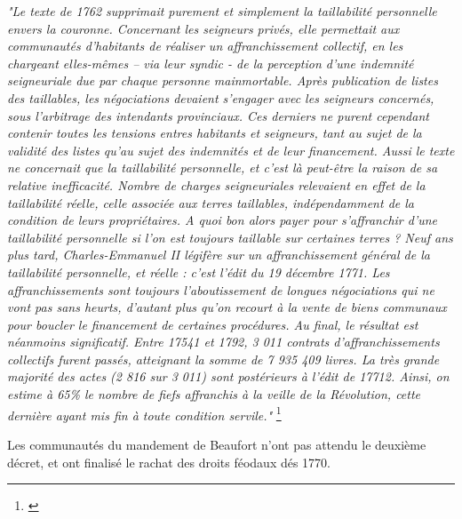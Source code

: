 \documentclass[a4paper,twoside,openany]{article}
\begin{document}
\textit{"Le texte de 1762 supprimait purement et simplement la taillabilité personnelle envers la
couronne. Concernant les seigneurs privés, elle permettait aux communautés d’habitants de
réaliser un affranchissement collectif, en les chargeant elles-mêmes – via leur syndic - de la
perception d’une indemnité seigneuriale due par chaque personne mainmortable. Après
publication de listes des taillables, les négociations devaient s’engager avec les seigneurs
concernés, sous l’arbitrage des intendants provinciaux. Ces derniers ne purent cependant
contenir toutes les tensions entres habitants et seigneurs, tant au sujet de la validité des listes
qu’au sujet des indemnités et de leur financement. Aussi le texte ne concernait que la taillabilité
personnelle, et c’est là peut-être la raison de sa relative inefficacité. Nombre de charges
seigneuriales relevaient en effet de la taillabilité réelle, celle associée aux terres taillables,
indépendamment de la condition de leurs propriétaires. A quoi bon alors payer pour s’affranchir
d’une taillabilité personnelle si l’on est toujours taillable sur certaines terres ?
Neuf ans plus tard, Charles-Emmanuel II légifère sur un affranchissement général de la
taillabilité personnelle, et réelle : c’est l’édit du 19 décembre 1771. Les affranchissements sont
toujours l’aboutissement de longues négociations qui ne vont pas sans heurts, d’autant plus
qu’on recourt à la vente de biens communaux pour boucler le financement de certaines
procédures. Au final, le résultat est néanmoins significatif. Entre 17541 et 1792, 3 011 contrats
d’affranchissements collectifs furent passés, atteignant la somme de 7 935 409 livres. La très
grande majorité des actes (2 816 sur 3 011) sont postérieurs à l’édit de 17712. Ainsi, on estime
à 65\% le nombre de fiefs affranchis à la veille de la Révolution, cette dernière ayant mis fin à
toute condition servile."} \footnote{\cite{Gachet2022}}

Les communautés du mandement de Beaufort n'ont pas attendu le deuxième décret, et ont finalisé le rachat des droits féodaux dés 1770.
\end{document}

